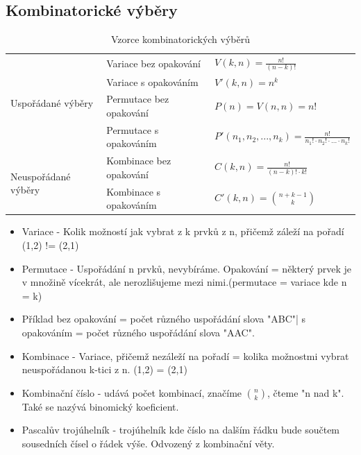 \documentclass[10pt,a4paper]{article}
\begin{document}
\subsection{Kombinatorické výběry}
\renewcommand{\arraystretch}{2} 
\begin{table}[ht]
\centering
\begin{tabular}{l|l|l}
\hline
\multirow{4}{*}{Uspořádané výběry}   & Variace bez opakování   & $\displaystyle V(k, n) = \frac{n!}{(n-k)!}$ \\
                                     & Variace s opakováním    & $\displaystyle V'(k, n) = n^k$ \\
                                     & Permutace bez opakování & $\displaystyle P(n) = V(n, n) = n!$ \\
                                     & Permutace s opakováním  & $\displaystyle P'(n_1,n_2,...,n_k) = \frac{ n!}{n_1!\cdot{}n_2!\cdot{}...\cdot{}n_k!}$ \\
\multirow{2}{*}{Neuspořádané výběry} & Kombinace bez opakování & $\displaystyle C(k, n) = \frac{n!}{(n-k)!\cdot k!}$ \\
                                     & Kombinace s opakováním  & $\displaystyle C'(k, n) = \genfrac(){0pt}{0}{n+k-1}{k}$ \\ 
\hline
\end{tabular}
\caption{Vzorce kombinatorických výběrů}
\label{tab:kombVzorce}
\end{table}
\renewcommand{\arraystretch}{1} 
\begin{itemize}
\item Variace - Kolik možností jak vybrat z k prvků z n, přičemž záleží na pořadí (1,2) != (2,1)
\item Permutace - Uspořádání n prvků, nevybíráme. Opakování = některý prvek je v množině vícekrát, ale nerozlišujeme mezi nimi.(permutace = variace kde n = k)
\item Příklad bez opakování = počet různého uspořádání slova "ABC"| s opakováním = počet různého uspořádání slova "AAC".
\item Kombinace - Variace, přičemž nezáleží na pořadí = kolika možnostmi vybrat neuspořádanou k-tici z n. (1,2) = (2,1)
\item Kombinační číslo - udává počet kombinací, značíme $\displaystyle \binom{n}{k}$, čteme "n nad k". Také se nazývá binomický koeficient.
\item Pascalův trojúhelník - trojúhelník kde číslo na dalším řádku bude součtem sousedních čísel o řádek výše. Odvozený z kombinační věty.
\end{itemize}
\end{document}
